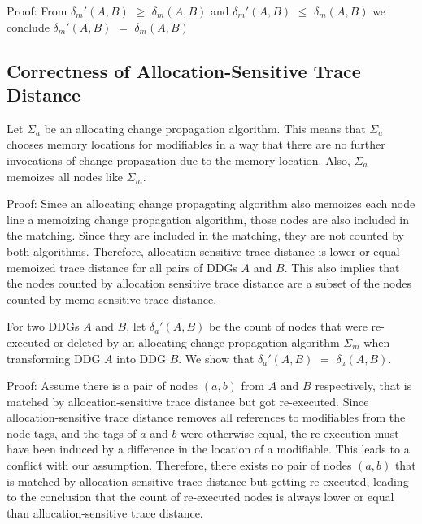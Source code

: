\begin{theorem}[$\delta_m'(A, B)$ $=$ $\delta_m(A, B)$]
Proof: From $\delta_m'(A, B)$ $\ge$ $\delta_m(A, B)$ and $\delta_m'(A, B)$ $\le$ $\delta_m(A, B)$ we conclude $\delta_m'(A, B)$ $=$ $\delta_m(A, B)$ 
\end{theorem}

\subsection{Correctness of Allocation-Sensitive Trace Distance}

\begin{definition}
Let $\Sigma_a$ be an allocating change propagation algorithm. This means that $\Sigma_a$ chooses memory locations for modifiables in a way that there are no further invocations of change propagation due to the memory location. Also, $\Sigma_a$ memoizes all nodes like $\Sigma_m$. 
\end{definition}

\begin{lemma}
Proof: Since an allocating change propagating algorithm also memoizes each node line a memoizing change propagation algorithm, those nodes are also included in the matching. Since they are included in the matching, they are not counted by both algorithms. Therefore, allocation sensitive trace distance is lower or equal memoized trace distance for all pairs of DDGs $A$ and $B$. This also implies that the nodes counted by allocation sensitive trace distance are a subset of the nodes counted by memo-sensitive trace distance. 
\end{lemma}

For two DDGs $A$ and $B$, let $\delta_a'(A, B)$ be the count of nodes that were re-executed or deleted by an allocating change propagation algorithm $\Sigma_m$ when transforming DDG $A$ into DDG $B$. We show that $\delta_a'(A, B)$ $=$ $\delta_a(A, B)$. 

\begin{lemma}
Proof: Assume there is a pair of nodes $(a, b)$ from $A$ and $B$ respectively, that is matched by allocation-sensitive trace distance but got re-executed. Since allocation-sensitive trace distance removes all references to modifiables from the node tags, and the tags of $a$ and $b$ were otherwise equal, the re-execution must have been induced by a difference in the location of a modifiable. This leads to a conflict with our assumption. Therefore, there exists no pair of nodes $(a, b)$ that is matched by allocation sensitive trace distance but getting re-executed, leading to the conclusion that the count of re-executed nodes is always lower or equal than allocation-sensitive trace distance. 
\end{lemma}

